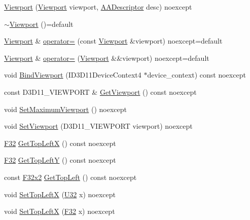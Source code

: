 \begin{DoxyCompactItemize}
\item 
\hyperlink{classmage_1_1_viewport_ab7d18e04b5c6f35a1a95af5f2e4ba971}{Viewport} (\hyperlink{classmage_1_1_viewport}{Viewport} viewport, \hyperlink{namespacemage_a0b400065340fa5cca0ce4c2809d91af1}{A\+A\+Descriptor} desc) noexcept
\item 
\hyperlink{classmage_1_1_viewport_a6fcf68e154b186d5c6241c495cc93fe5}{$\sim$\+Viewport} ()=default
\item 
\hyperlink{classmage_1_1_viewport}{Viewport} \& \hyperlink{classmage_1_1_viewport_a4861a25cdb8baf2e0a589ac3b4a2f4cf}{operator=} (const \hyperlink{classmage_1_1_viewport}{Viewport} \&viewport) noexcept=default
\item 
\hyperlink{classmage_1_1_viewport}{Viewport} \& \hyperlink{classmage_1_1_viewport_aa5bc8241e9a0669f2a5fdf96405f769a}{operator=} (\hyperlink{classmage_1_1_viewport}{Viewport} \&\&viewport) noexcept=default
\item 
void \hyperlink{classmage_1_1_viewport_a363d750cdb8c21ee5b3e68a323f914db}{Bind\+Viewport} (I\+D3\+D11\+Device\+Context4 $\ast$device\+\_\+context) const noexcept
\item 
const D3\+D11\+\_\+\+V\+I\+E\+W\+P\+O\+RT \& \hyperlink{classmage_1_1_viewport_ad4bb75cdfbd137182898caad913de4d1}{Get\+Viewport} () const noexcept
\item 
void \hyperlink{classmage_1_1_viewport_a5af006b8ec0464a924c3822265727ee2}{Set\+Maximum\+Viewport} () noexcept
\item 
void \hyperlink{classmage_1_1_viewport_a9aba04d25661bc6ba2375de3bd9ba41e}{Set\+Viewport} (D3\+D11\+\_\+\+V\+I\+E\+W\+P\+O\+RT viewport) noexcept
\item 
\hyperlink{namespacemage_aa97e833b45f06d60a0a9c4fc22ae02c0}{F32} \hyperlink{classmage_1_1_viewport_a8ca949f032906839c8cf4ab6018bb2ba}{Get\+Top\+LeftX} () const noexcept
\item 
\hyperlink{namespacemage_aa97e833b45f06d60a0a9c4fc22ae02c0}{F32} \hyperlink{classmage_1_1_viewport_a9d1ddb340c775c3652c816c551653d69}{Get\+Top\+LeftY} () const noexcept
\item 
const \hyperlink{namespacemage_aa87237ad091f5cd7da612b8523fc108f}{F32x2} \hyperlink{classmage_1_1_viewport_a6b4be7d37cc6d52d0c238f266b80a23f}{Get\+Top\+Left} () const noexcept
\item 
void \hyperlink{classmage_1_1_viewport_ade1d4a8ed0ecb51f7e70551f20cb4bea}{Set\+Top\+LeftX} (\hyperlink{namespacemage_a41c104c036fba3756a74e19f793eeaa1}{U32} x) noexcept
\item 
void \hyperlink{classmage_1_1_viewport_a4626d58f3b62ed61318a090bf9522c9a}{Set\+Top\+LeftX} (\hyperlink{namespacemage_aa97e833b45f06d60a0a9c4fc22ae02c0}{F32} x) noexcept

\end{DoxyCompactItemize}

